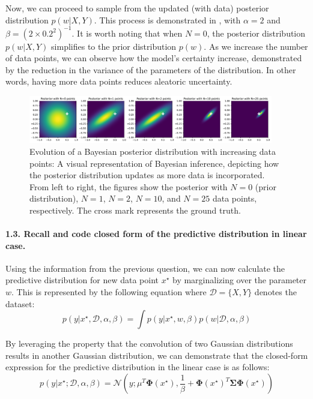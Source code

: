 Now, we can proceed to sample from the updated (with data) posterior distribution $p(w | X, Y)$. This process is demonstrated in , with $\alpha = 2$ and $\beta = (2 \times 0.2^2)^{-1}$. It is worth noting that when $N=0$, the posterior distribution $p(w|X,Y)$ simplifies to the prior distribution $p(w)$. As we increase the number of data points, we can observe how the model's certainty increase, demonstrated by the reduction in the variance of the parameters of the distribution. In other words, having more data points reduces aleatoric uncertainty.

\begin{figure}[H]
    \centering
    \includegraphics[width=0.95\textwidth]{posterior.pdf}
    \caption{Evolution of a Bayesian posterior distribution with increasing data points: A visual representation of Bayesian inference, depicting how the posterior distribution updates as more data is incorporated. From left to right, the figures show the posterior with $N=0$ (prior distribution), $N=1$, $N=2$, $N=10$, and $N=25$ data points, respectively. The cross mark represents the ground truth.}
    \label{fig:posterior}
\end{figure}

\paragraph*{1.3. Recall and code closed form of the predictive distribution in linear case.}
Using the information from the previous question, we can now calculate the predictive distribution for new data point $x^\star$ by marginalizing over the parameter $w$. This is represented by the following equation where $\mathcal{D} = \{X,Y\}$ denotes the dataset:
\[ p(y|x^\star , \mathcal{D}, \alpha, \beta ) = \int p(y| x^\star, w, \beta)p(w| \mathcal{D}, \alpha, \beta ) \]

By leveraging the property that the convolution of two Gaussian distributions results in another Gaussian distribution, we can demonstrate that the closed-form expression for the predictive distribution in the linear case is as follows:
\[ p\left(y|x^\star; \mathcal{D}, \alpha, \beta\right) = \mathcal{N}\left(y; \mu^T \boldsymbol{\Phi}(x^\star), \frac{1}{\beta} + \boldsymbol{\Phi}(x^\star)^T \boldsymbol{\Sigma} \boldsymbol{\Phi}(x^\star)\right) \]

